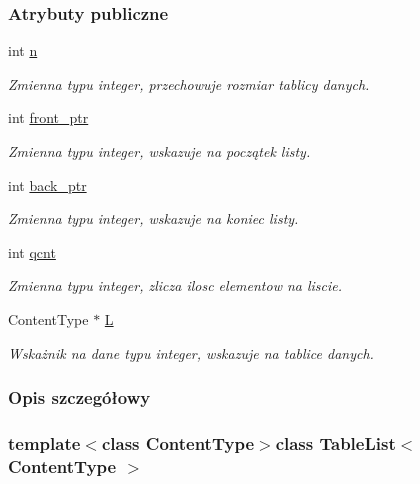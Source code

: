 \subsubsection*{Atrybuty publiczne}
\begin{DoxyCompactItemize}
\item 
int \hyperlink{class_table_list_af60a60e1c22ab2e6f3745d5c1b5c1c1e}{n}
\begin{DoxyCompactList}\small\item\em Zmienna typu integer, przechowuje rozmiar tablicy danych. \end{DoxyCompactList}\item 
int \hyperlink{class_table_list_a91f5e1b1f71e168541fca858c41a205d}{front\-\_\-ptr}
\begin{DoxyCompactList}\small\item\em Zmienna typu integer, wskazuje na początek listy. \end{DoxyCompactList}\item 
int \hyperlink{class_table_list_a7b74b24a81ee8ea30844fbca7b52c131}{back\-\_\-ptr}
\begin{DoxyCompactList}\small\item\em Zmienna typu integer, wskazuje na koniec listy. \end{DoxyCompactList}\item 
int \hyperlink{class_table_list_a7a1afb80d51b9a3dae8b29cbc3335648}{qcnt}
\begin{DoxyCompactList}\small\item\em Zmienna typu integer, zlicza ilosc elementow na liscie. \end{DoxyCompactList}\item 
Content\-Type $\ast$ \hyperlink{class_table_list_a18c24d5cce01d71624b04434ad4e5b91}{L}
\begin{DoxyCompactList}\small\item\em Wskażnik na dane typu integer, wskazuje na tablice danych. \end{DoxyCompactList}\end{DoxyCompactItemize}


\subsubsection{Opis szczegółowy}
\subsubsection*{template$<$class Content\-Type$>$class Table\-List$<$ Content\-Type $>$}



